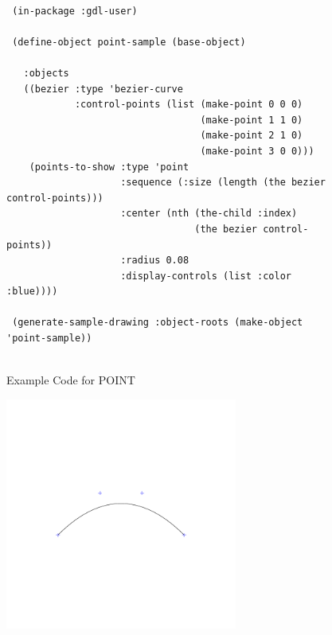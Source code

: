 \documentclass [11pt]{book}
\begin{document}
\begin{itemize}
\begin{description}
\end{description}




\begin{figure}
\begin{lrbox}{\boxedverb}
\begin{minipage}{\linewidth}
{\small

\begin{verbatim}

 (in-package :gdl-user)

 (define-object point-sample (base-object)
   
   :objects
   ((bezier :type 'bezier-curve
            :control-points (list (make-point 0 0 0)
                                  (make-point 1 1 0)
                                  (make-point 2 1 0)
                                  (make-point 3 0 0)))
    (points-to-show :type 'point
                    :sequence (:size (length (the bezier control-points)))
                    :center (nth (the-child :index) 
                                 (the bezier control-points))
                    :radius 0.08
                    :display-controls (list :color :blue))))

 (generate-sample-drawing :object-roots (make-object 'point-sample))


\end{verbatim}}
\end{minipage}
\end{lrbox}
\fbox{\usebox{\boxedverb}}

\caption{Example Code for POINT}

\label{fig:example-code-POINT}

\end{figure}

\begin{figure}
\begin{center}
\includegraphics[width=3in,height=3in]{../images/example-point.pdf}
\end{center}


\end{figure}
\end{itemize}
\end{document}
